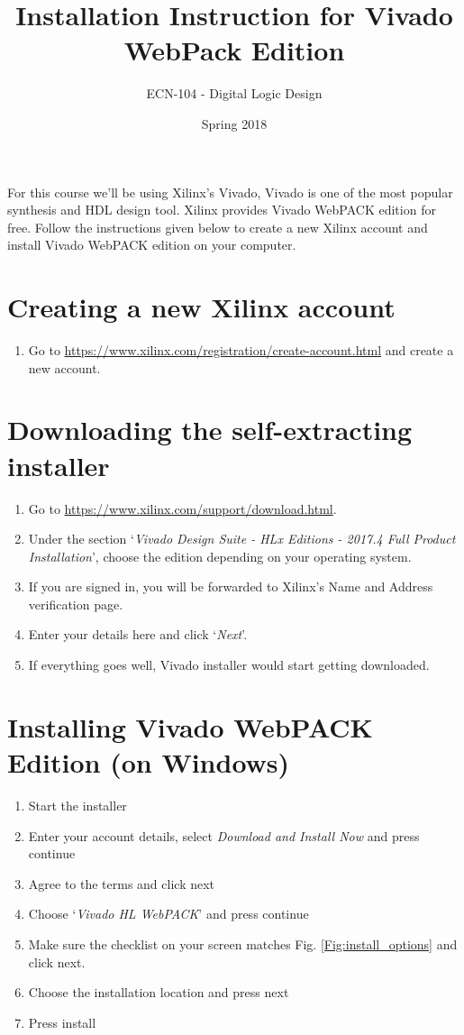 \documentclass{article}
\title{Installation Instruction for Vivado WebPack Edition}
\author{ECN-104 - Digital Logic Design }
\date{Spring 2018}
\begin{document}
\maketitle

For this course we'll be using Xilinx's Vivado, Vivado is one of the most popular synthesis and HDL design tool. Xilinx provides Vivado WebPACK edition for free. Follow the instructions given below to create a new Xilinx account and install Vivado WebPACK edition on your computer. 

\section{Creating a new Xilinx account}
\begin{enumerate}
\item Go to \url{https://www.xilinx.com/registration/create-account.html} and create a new account.
\end{enumerate}

\section{Downloading the self-extracting installer}
\begin{enumerate}
\item Go to \url{https://www.xilinx.com/support/download.html}.
\item Under the section `\textit{Vivado Design Suite - HLx Editions - 2017.4  Full Product Installation}', choose the edition depending on your operating system.
\item If you are signed in, you will be forwarded to Xilinx's Name and Address verification page.
\item Enter your details here and click `\textit{Next}'.
\item If everything goes well, Vivado installer would start getting downloaded.
\end{enumerate}

\section{Installing Vivado WebPACK Edition (on Windows)}
\begin{enumerate}
    \item Start the installer
    \item Enter your account details, select \textit{Download and Install Now} and press continue
    \item Agree to the terms and click next
    \item Choose `\textit{Vivado HL WebPACK}' and press continue
    \item Make sure the checklist on your screen matches Fig. \ref{Fig:install_options} and click next.
    \item Choose the installation location and press next
    \item Press install
\end{enumerate}
\end{document}
